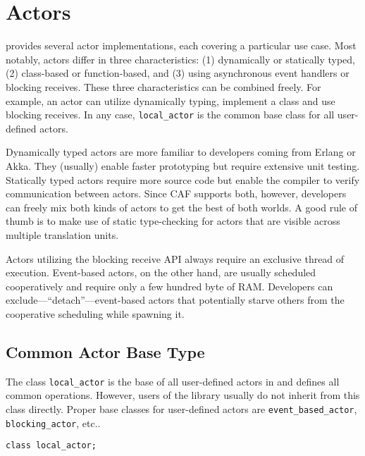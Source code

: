 \section{Actors}
\label{actors}

\lib provides several actor implementations, each covering a particular use case.
Most notably, actors differ in three characteristics: (1) dynamically or statically typed, (2) class-based or function-based, and (3) using asynchronous event handlers or blocking receives.
These three characteristics can be combined freely.
For example, an actor can utilize dynamically typing, implement a class and use blocking receives.
In any case, \lstinline^local_actor^ is the common base class for all user-defined actors.

Dynamically typed actors are more familiar to developers coming from Erlang or Akka.
They (usually) enable faster prototyping but require extensive unit testing.
Statically typed actors require more source code but enable the compiler to verify communication between actors.
Since CAF supports both, however, developers can freely mix both kinds of actors to get the best of both worlds.
A good rule of thumb is to make use of static type-checking for actors that are visible across multiple translation units.

Actors utilizing the blocking receive API always require an exclusive thread of execution. Event-based actors, on the other hand, are usually scheduled cooperatively and require only a few hundred byte of RAM. Developers can exclude---``detach''---event-based actors that potentially starve others from the cooperative scheduling while spawning it.

\clearpage
\subsection{Common Actor Base Type}
\label{interface}

The class \lstinline^local_actor^ is the base of all user-defined actors in \lib and defines all common operations.
However, users of the library usually do not inherit from this class directly. Proper base classes for user-defined actors are \lstinline^event_based_actor^, \lstinline^blocking_actor^, etc..

\lstinline^class local_actor;^

